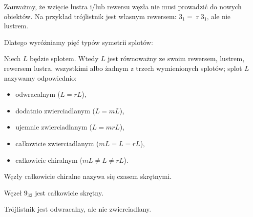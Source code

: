 Zauważmy, że wzięcie lustra i/lub rewersu węzła nie musi prowadzić do nowych obiektów.
Na przykład trójlistnik jest własnym rewersem: $3_1 = \operatorname{r} 3_1$, ale nie lustrem.

Dlatego wyróżniamy pięć typów symetrii splotów:

\begin{definition}
    Niech $L$ będzie splotem.
    Wtedy $L$ jest równoważny ze swoim rewersem, lustrem, rewersem lustra, wszystkimi albo żadnym z trzech wymienionych splotów;
    splot $L$ nazywamy odpowiednio:
    \begin{itemize}
        \item odwracalnym ($L = rL$),
        \item dodatnio zwierciadlanym ($L = mL$),
        \item ujemnie zwierciadlanym ($L = mrL$),
        \item całkowicie zwierciadlanym ($mL = L = rL$),
        \item całkowicie chiralnym ($mL \neq L \neq rL$).
    \end{itemize}
%
%
%
%
\end{definition}

Węzły całkowicie chiralne nazywa się czasem skrętnymi.


\begin{example}
    Węzeł $9_{32}$ jest całkowicie skrętny.
\end{example}


\begin{example}
    \label{exm:trefoil_is_chiral}
    Trójlistnik jest odwracalny, ale nie zwierciadlany.
\end{example}


